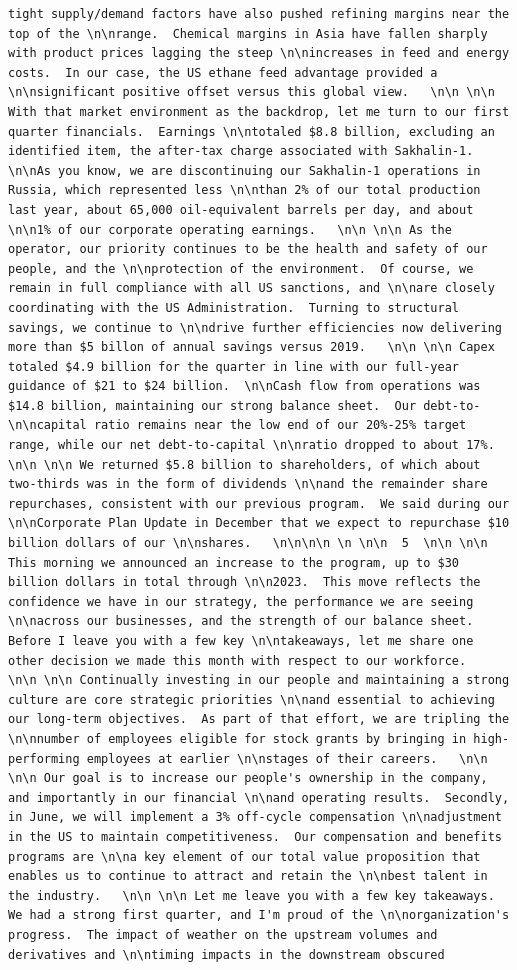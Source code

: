 \documentclass[
  letterpaper,
  DIV=11,
  numbers=noendperiod]{scrreprt}
\begin{document}
\begin{verbatim}
tight supply/demand factors have also pushed refining margins near the top of the \n\nrange.  Chemical margins in Asia have fallen sharply with product prices lagging the steep \n\nincreases in feed and energy costs.  In our case, the US ethane feed advantage provided a \n\nsignificant positive offset versus this global view.   \n\n \n\n With that market environment as the backdrop, let me turn to our first quarter financials.  Earnings \n\ntotaled $8.8 billion, excluding an identified item, the after-tax charge associated with Sakhalin-1.  \n\nAs you know, we are discontinuing our Sakhalin-1 operations in Russia, which represented less \n\nthan 2% of our total production last year, about 65,000 oil-equivalent barrels per day, and about \n\n1% of our corporate operating earnings.   \n\n \n\n As the operator, our priority continues to be the health and safety of our people, and the \n\nprotection of the environment.  Of course, we remain in full compliance with all US sanctions, and \n\nare closely coordinating with the US Administration.  Turning to structural savings, we continue to \n\ndrive further efficiencies now delivering more than $5 billon of annual savings versus 2019.   \n\n \n\n Capex totaled $4.9 billion for the quarter in line with our full-year guidance of $21 to $24 billion.  \n\nCash flow from operations was $14.8 billion, maintaining our strong balance sheet.  Our debt-to-\n\ncapital ratio remains near the low end of our 20%-25% target range, while our net debt-to-capital \n\nratio dropped to about 17%.   \n\n \n\n We returned $5.8 billion to shareholders, of which about two-thirds was in the form of dividends \n\nand the remainder share repurchases, consistent with our previous program.  We said during our \n\nCorporate Plan Update in December that we expect to repurchase $10 billion dollars of our \n\nshares.   \n\n\n\n \n \n\n  5  \n\n \n\n This morning we announced an increase to the program, up to $30 billion dollars in total through \n\n2023.  This move reflects the confidence we have in our strategy, the performance we are seeing \n\nacross our businesses, and the strength of our balance sheet.  Before I leave you with a few key \n\ntakeaways, let me share one other decision we made this month with respect to our workforce.   \n\n \n\n Continually investing in our people and maintaining a strong culture are core strategic priorities \n\nand essential to achieving our long-term objectives.  As part of that effort, we are tripling the \n\nnumber of employees eligible for stock grants by bringing in high-performing employees at earlier \n\nstages of their careers.   \n\n \n\n Our goal is to increase our people's ownership in the company, and importantly in our financial \n\nand operating results.  Secondly, in June, we will implement a 3% off-cycle compensation \n\nadjustment in the US to maintain competitiveness.  Our compensation and benefits programs are \n\na key element of our total value proposition that enables us to continue to attract and retain the \n\nbest talent in the industry.   \n\n \n\n Let me leave you with a few key takeaways.  We had a strong first quarter, and I'm proud of the \n\norganization's progress.  The impact of weather on the upstream volumes and derivatives and \n\ntiming impacts in the downstream obscured 
\end{verbatim}
\end{document}
